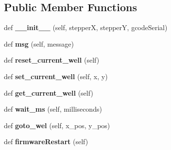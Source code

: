 \subsection*{Public Member Functions}
\begin{DoxyCompactItemize}
\item 
def {\bfseries \+\_\+\+\_\+init\+\_\+\+\_\+} (self, stepperX, stepperY, gcode\+Serial)\hypertarget{classstepper_1_1_stepper_wellpositioning_a39fd3eeef150ae1fdaa5a63c5cac1904}{}\label{classstepper_1_1_stepper_wellpositioning_a39fd3eeef150ae1fdaa5a63c5cac1904}

\item 
def {\bfseries msg} (self, message)\hypertarget{classstepper_1_1_stepper_wellpositioning_a970090d87894de2fe922df0bf248cfae}{}\label{classstepper_1_1_stepper_wellpositioning_a970090d87894de2fe922df0bf248cfae}

\item 
def {\bfseries reset\+\_\+current\+\_\+well} (self)\hypertarget{classstepper_1_1_stepper_wellpositioning_a80852795d8751db5b8d351d0d94c3b38}{}\label{classstepper_1_1_stepper_wellpositioning_a80852795d8751db5b8d351d0d94c3b38}

\item 
def {\bfseries set\+\_\+current\+\_\+well} (self, x, y)\hypertarget{classstepper_1_1_stepper_wellpositioning_aa354e3491d1ec6f2c1ed1053a08f7191}{}\label{classstepper_1_1_stepper_wellpositioning_aa354e3491d1ec6f2c1ed1053a08f7191}

\item 
def {\bfseries get\+\_\+current\+\_\+well} (self)\hypertarget{classstepper_1_1_stepper_wellpositioning_a99c1c7961cbe3b6b22c74d4883726eba}{}\label{classstepper_1_1_stepper_wellpositioning_a99c1c7961cbe3b6b22c74d4883726eba}

\item 
def {\bfseries wait\+\_\+ms} (self, milliseconds)\hypertarget{classstepper_1_1_stepper_wellpositioning_ac89fd6526aeb8b4ccd17924252ee9250}{}\label{classstepper_1_1_stepper_wellpositioning_ac89fd6526aeb8b4ccd17924252ee9250}

\item 
def {\bfseries goto\+\_\+wel} (self, x\+\_\+pos, y\+\_\+pos)\hypertarget{classstepper_1_1_stepper_wellpositioning_aacfe7748cea3d2531e6cd8f73d33f84b}{}\label{classstepper_1_1_stepper_wellpositioning_aacfe7748cea3d2531e6cd8f73d33f84b}

\item 
def {\bfseries firmware\+Restart} (self)\hypertarget{classstepper_1_1_stepper_wellpositioning_adcd22bc691835b5398a56318f5b8a5ac}{}\label{classstepper_1_1_stepper_wellpositioning_adcd22bc691835b5398a56318f5b8a5ac}


\end{DoxyCompactItemize}
